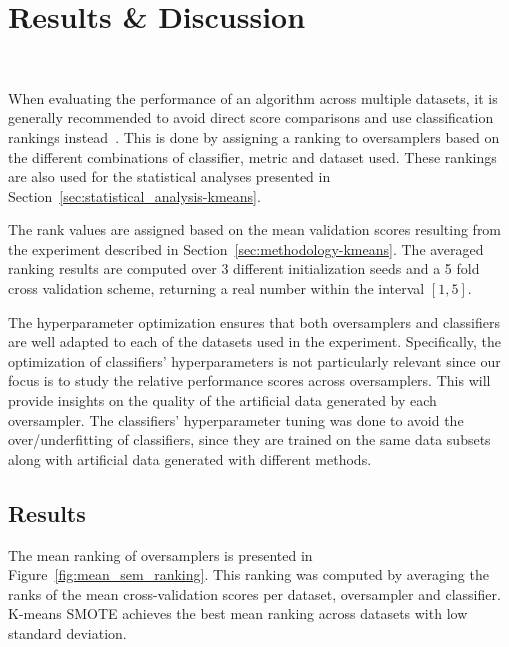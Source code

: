 \section{Results \& Discussion}~\label{sec:results-kmeans}

When evaluating the performance of an algorithm across multiple datasets, it
is generally recommended to avoid direct score comparisons and use
classification rankings instead~\cite{Demsar2006}. This is done by assigning
a ranking to oversamplers based on the different combinations of classifier,
metric and dataset used. These rankings are also used for the statistical
analyses presented in Section~\ref{sec:statistical_analysis-kmeans}.

The rank values are assigned based on the mean validation scores resulting
from the experiment described in Section~\ref{sec:methodology-kmeans}. The averaged
ranking results are computed over 3 different initialization seeds and a 5
fold cross validation scheme, returning a real number within the interval
$[1,5]$.

The hyperparameter optimization ensures that both oversamplers and classifiers
are well adapted to each of the datasets used in the experiment. Specifically,
the optimization of classifiers' hyperparameters is not particularly relevant
since our focus is to study the relative performance scores across
oversamplers. This will provide insights on the quality of the artificial data
generated by each oversampler. The classifiers' hyperparameter tuning was done
to avoid the over/underfitting of classifiers, since they are trained on the same
data subsets along with artificial data generated with different methods.

\subsection{Results}

The mean ranking of oversamplers is presented in
Figure~\ref{fig:mean_sem_ranking}. This ranking was computed by averaging the
ranks of the mean cross-validation scores per dataset, oversampler and
classifier. K-means SMOTE achieves the best mean ranking across datasets with
low standard deviation.


